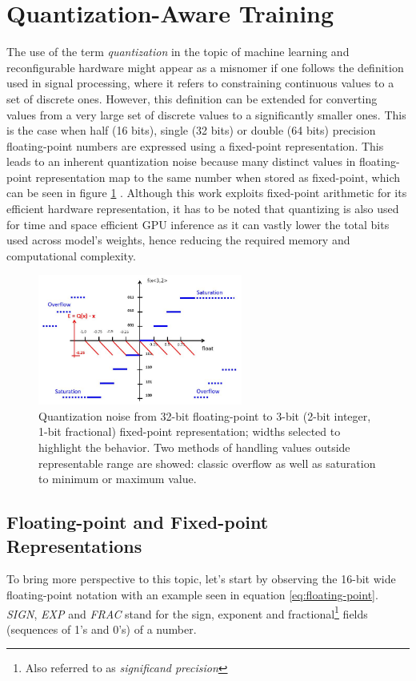 \section{Quantization-Aware Training}\label{pre-training-quantization}
The use of the term \textit{quantization} in the topic of machine learning and reconfigurable hardware might appear as a misnomer if one follows the definition used in signal processing, where it refers to constraining continuous values to a set of discrete ones. However, this definition can be extended for converting values from a very large set of discrete values to a 
significantly smaller ones. This is the case when half (16 bits), single (32 bits) or double (64 bits) precision floating-point numbers are expressed using a fixed-point representation. This leads to an inherent quantization noise because many distinct values in floating-point representation map to the same number when stored as fixed-point, which can be seen in figure \ref{fig:float-to-fixed} \cite{76-shaumontfixed}. Although this work exploits fixed-point arithmetic for its efficient hardware representation, it has to be noted that quantizing is also used for time and space efficient GPU inference as it can vastly lower the total bits used across model's weights, hence reducing the required memory and computational complexity.

\begin{figure}[hpt!]
  \centering
  \includegraphics[trim={0cm 0cm 0cm 0cm}, width=0.6\textwidth, center]{models/float_to_fixed.jpg}
  \caption{Quantization noise from 32-bit floating-point to 3-bit (2-bit integer, 1-bit fractional) fixed-point representation; widths selected to highlight the behavior. Two methods of handling values outside representable range are showed: classic overflow as well as saturation to minimum or maximum value.}
  \label{fig:float-to-fixed}
\end{figure}

\subsection{Floating-point and Fixed-point Representations}
To bring more perspective to this topic, let's start by observing the 16-bit wide floating-point notation with an example seen in equation \ref{eq:floating-point}. \textit{SIGN}, \textit{EXP} and \textit{FRAC} stand for the sign, exponent and fractional\footnote{Also referred to as \textit{significand precision}} fields (sequences of 1's and 0's) of a number.

